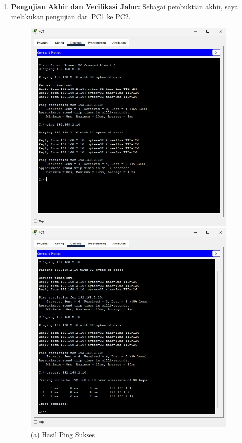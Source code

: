 \begin{enumerate}
    \item \textbf{Pengujian Akhir dan Verifikasi Jalur:} Sebagai pembuktian akhir, saya melakukan pengujian dari PC1 ke PC2.
    \begin{figure}[H]
        \centering
        \begin{minipage}{0.48\textwidth}
            \centering
            \includegraphics[width=\textwidth]{img5/Pingsuccess.jpeg}
            \caption*{(a) Hasil Ping Sukses}
        \end{minipage}\hfill
        \begin{minipage}{0.48\textwidth}
            \centering
            \includegraphics[width=\textwidth]{img5/P1Tracert.jpeg}

\end{minipage}
\end{figure}
\end{enumerate}
